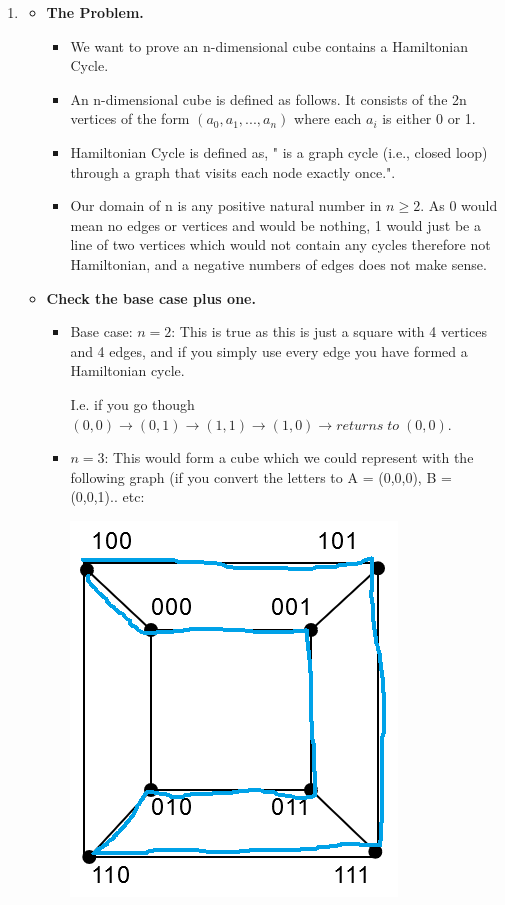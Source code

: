 \documentclass{article}
\begin{document}
\begin{enumerate}
\begin{enumerate}
        \item
        \begin{itemize}          
          \item \textbf{The Problem.}
          \begin{itemize}
            \item We want to prove an n-dimensional cube contains a Hamiltonian Cycle. 
            \item An n-dimensional cube is defined as follows. It consists of the 2n vertices of the form $(a_0, a_1, ..., a_n)$ where each $a_i$ is either 0 or 1.
            \item Hamiltonian Cycle is defined as, " is a graph cycle (i.e., closed loop) through a graph that visits each node exactly once.".
            \item Our domain of n is any positive natural number in $n \ge 2$. As 0 would mean no edges or vertices and would be nothing, 1 would just be a line of two vertices which would not contain any cycles therefore not Hamiltonian, and a negative numbers of edges does not make sense.
          \end{itemize}
          \item \textbf{Check the base case plus one.}
          \begin{itemize}
            \item Base case: $n = 2$: This is true as this is just a square with 4 vertices and 4 edges, and if you simply use every edge you have formed a Hamiltonian cycle.
            
            I.e. if you go though $(0,0) \rightarrow (0,1) \rightarrow (1,1) \rightarrow (1,0) \rightarrow returns\;to\;(0,0)$.
            \item $n = 3$: This would form a cube which we could represent with the following graph (if you convert the letters to A = (0,0,0), B = (0,0,1).. etc:             
            
            \includegraphics[scale=0.5]{cube.png}


\end{itemize}
\end{itemize}
\end{enumerate}
\end{enumerate}
\end{document}

